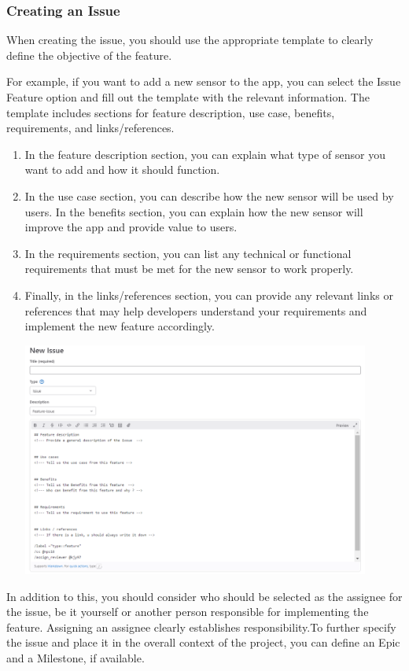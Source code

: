 \documentclass[12pt]{article}
\begin{document}
\subsubsection{Creating an Issue}
When creating the issue, you should use the appropriate template to clearly define the objective of the feature. 

For example, if you want to add a new sensor to the app, you can select the Issue Feature option and fill out the template with the relevant information. The template includes sections for feature description, use case, benefits, requirements, and links/references. 
 \begin{enumerate}
      \item
      In the feature description section, you can explain what type of sensor you want to add and how it should function. 
      \item
      In the use case section, you can describe how the new sensor will be used by users. In the benefits section, you can explain how the new sensor will improve the app and provide value to users. 
      \item
      In the requirements section, you can list any technical or functional requirements that must be met for the new sensor to work properly. 
      \item
      Finally, in the links/references section, you can provide any relevant links or references that may help developers understand your requirements and implement the new feature accordingly. 
      

    \includegraphics[width=0.9\textwidth]{issue.png}
  
 \end{enumerate}

In addition to this, you should consider who should be selected as the assignee for the issue, be it yourself or another person responsible for implementing the feature. Assigning an assignee clearly establishes responsibility.To further specify the issue and place it in the overall context of the project, you can define an Epic and a Milestone, if available. 
\end{document}

